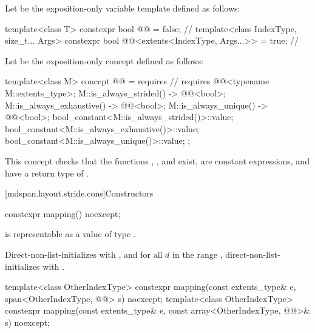 \pnum
Let  be the exposition-only variable template
defined as follows:
\begin{codeblock}
template<class T>
  constexpr bool @@ = false;                              // \expos
template<class IndexType, size_t... Args>
  constexpr bool @@<extents<IndexType, Args...>> = true;  // \expos
\end{codeblock}

\pnum
Let  be the exposition-only concept
defined as follows:
\begin{codeblock}
template<class M>
concept @@ = requires {                         // \expos
  requires @@<typename M::extents_type>;
  { M::is_always_strided() } -> @@<bool>;
  { M::is_always_exhaustive() } -> @@<bool>;
  { M::is_always_unique() } -> @@<bool>;
  bool_constant<M::is_always_strided()>::value;
  bool_constant<M::is_always_exhaustive()>::value;
  bool_constant<M::is_always_unique()>::value;
};
\end{codeblock}
\begin{note}
This concept checks that the functions
,
, and
 exist,
are constant expressions, and
have a return type of .
\end{note}

[mdspan.layout.stride.cons]{Constructors}

%
\begin{itemdecl}
constexpr mapping() noexcept;
\end{itemdecl}

\begin{itemdescr}
\pnum
\expects
{}
is representable as a value of type .

\pnum
\effects
Direct-non-list-initializes  with , and
for all $d$ in the range ,
direct-non-list-initializes  with
.
\end{itemdescr}

%
\begin{itemdecl}
template<class OtherIndexType>
  constexpr mapping(const extents_type& e, span<OtherIndexType, @@> s) noexcept;
template<class OtherIndexType>
  constexpr mapping(const extents_type& e, const array<OtherIndexType, @@>& s) noexcept;
\end{itemdecl}

